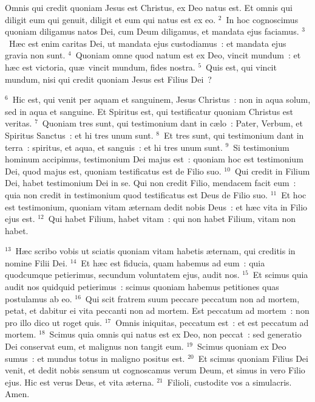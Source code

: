 \lettrine[lines=3,image=true,loversize=0.05,lraise=-0.03]{O}{}mnis qui credit quoniam Jesus est Christus, ex Deo natus est. Et omnis qui diligit eum qui genuit, diligit et eum qui natus est ex eo.
${}^{2}$~In hoc cognoscimus quoniam diligamus natos Dei, cum Deum diligamus, et mandata ejus faciamus.
${}^{3}$~H\ae c est enim caritas Dei, ut mandata ejus custodiamus~: et mandata ejus gravia non sunt.
${}^{4}$~Quoniam omne quod natum est ex Deo, vincit mundum~: et h\ae c est victoria, qu\ae\ vincit mundum, fides nostra.
${}^{5}$~Quis est, qui vincit mundum, nisi qui credit quoniam Jesus est Filius Dei~?


${}^{6}$~Hic est, qui venit per aquam et sanguinem, Jesus Christus~: non in aqua solum, sed in aqua et sanguine. Et Spiritus est, qui testificatur quoniam Christus est veritas.
${}^{7}$~Quoniam tres sunt, qui testimonium dant in c\ae lo~: Pater, Verbum, et Spiritus Sanctus~: et hi tres unum sunt.
${}^{8}$~Et tres sunt, qui testimonium dant in terra~: spiritus, et aqua, et sanguis~: et hi tres unum sunt.
${}^{9}$~Si testimonium hominum accipimus, testimonium Dei majus est~: quoniam hoc est testimonium Dei, quod majus est, quoniam testificatus est de Filio suo.
${}^{10}$~Qui credit in Filium Dei, habet testimonium Dei in se. Qui non credit Filio, mendacem facit eum~: quia non credit in testimonium quod testificatus est Deus de Filio suo.
${}^{11}$~Et hoc est testimonium, quoniam vitam \ae ternam dedit nobis Deus~: et h\ae c vita in Filio ejus est.
${}^{12}$~Qui habet Filium, habet vitam~: qui non habet Filium, vitam non habet.


${}^{13}$~H\ae c scribo vobis ut sciatis quoniam vitam habetis \ae ternam, qui creditis in nomine Filii Dei.
${}^{14}$~Et h\ae c est fiducia, quam habemus ad eum~: quia quodcumque petierimus, secundum voluntatem ejus, audit nos.
${}^{15}$~Et scimus quia audit nos quidquid petierimus~: scimus quoniam habemus petitiones quas postulamus ab eo.
${}^{16}$~Qui scit fratrem suum peccare peccatum non ad mortem, petat, et dabitur ei vita peccanti non ad mortem. Est peccatum ad mortem~: non pro illo dico ut roget quis.
${}^{17}$~Omnis iniquitas, peccatum est~: et est peccatum ad mortem.
${}^{18}$~Scimus quia omnis qui natus est ex Deo, non peccat~: sed generatio Dei conservat eum, et malignus non tangit eum.
${}^{19}$~Scimus quoniam ex Deo sumus~: et mundus totus in maligno positus est.
${}^{20}$~Et scimus quoniam Filius Dei venit, et dedit nobis sensum ut cognoscamus verum Deum, et simus in vero Filio ejus. Hic est verus Deus, et vita \ae terna.
${}^{21}$~Filioli, custodite vos a simulacris. Amen.
